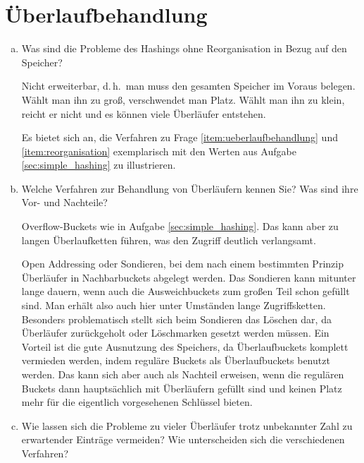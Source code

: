 \section{Überlaufbehandlung}

\begin{enumerate}[a)]
\item Was sind die Probleme des Hashings ohne Reorganisation in Bezug auf den Speicher?

\begin{solution}
Nicht erweiterbar, d.\,h.\ man muss den gesamten Speicher im Voraus belegen. Wählt man ihn zu groß, verschwendet man Platz. Wählt man ihn zu klein, reicht er nicht und es können viele Überläufer entstehen.
\end{solution}

\begin{note}
Es bietet sich an, die Verfahren zu Frage \ref{item:ueberlaufbehandlung} und \ref{item:reorganisation} exemplarisch mit den Werten aus Aufgabe \ref{sec:simple_hashing} zu illustrieren.
\end{note}

\item Welche Verfahren zur Behandlung von Überläufern kennen Sie? Was sind ihre Vor- und Nachteile?
\label{item:ueberlaufbehandlung}

\begin{solution}
Overflow-Buckets wie in Aufgabe \ref{sec:simple_hashing}.
Das kann aber zu langen Überlaufketten führen, was den Zugriff deutlich verlangsamt.

Open Addressing oder Sondieren, bei dem nach einem bestimmten Prinzip Überläufer in Nachbarbuckets abgelegt werden.
Das Sondieren kann mitunter lange dauern, wenn auch die Ausweichbuckets zum großen Teil schon gefüllt sind.
Man erhält also auch hier unter Umständen lange Zugriffsketten.
Besonders problematisch stellt sich beim Sondieren das Löschen dar, da Überläufer zurückgeholt oder Löschmarken gesetzt werden müssen.
Ein Vorteil ist die gute Ausnutzung des Speichers, da Überlaufbuckets komplett vermieden werden, indem reguläre Buckets als Überlaufbuckets benutzt werden. Das kann sich aber auch als Nachteil erweisen, wenn die regulären Buckets dann hauptsächlich mit Überläufern gefüllt sind und keinen Platz mehr für die eigentlich vorgesehenen Schlüssel bieten.
\end{solution}

\item Wie lassen sich die Probleme zu vieler Überläufer trotz unbekannter Zahl zu erwartender Einträge vermeiden?
Wie unterscheiden sich die verschiedenen Verfahren?
\label{item:reorganisation}


\end{enumerate}
